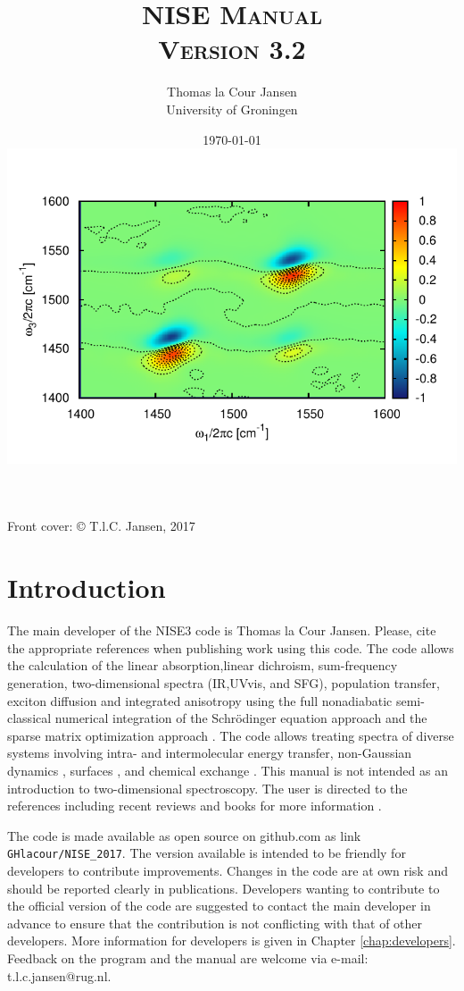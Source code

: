 \documentclass[12pt]{book}
\title{\textsc{NISE Manual\\ Version 3.2}}
\author{Thomas la Cour Jansen\\ University of Groningen}
\date{\today\\ \includegraphics{2ds.pdf}}
\begin{document}
\maketitle

\thispagestyle{empty}
\rule{0mm}{0mm}
\noindent
\thispagestyle{empty}
Front cover: 
\copyright \/ T.l.C. Jansen, 2017
\setcounter{page}{1}
\thispagestyle{empty}
\clearpage

\setcounter{page}{1}


\chapter{Introduction}
The main developer of the NISE3 code is Thomas la Cour Jansen. Please, cite the appropriate
references \cite{Jansen.2006.JPCB.110.22910,Jansen.2009.ACR.42.1405,Jansen.2010.JCP.132.224503,Liang.2012.JCTC.8.1706,Liang.2013.JPCL.4.448}
when publishing work using this code. The code allows the calculation of the linear absorption,linear dichroism, sum-frequency generation, two-dimensional spectra (IR,UVvis, and SFG), population transfer, exciton diffusion and integrated anisotropy using the full nonadiabatic semi-classical numerical integration of the Schr\"{o}dinger equation approach
\cite{Jansen.2009.ACR.42.1405} and the sparse matrix optimization approach \cite{Liang.2012.JCTC.8.1706}. The code allows treating spectra of diverse systems involving
intra- and intermolecular energy transfer\cite{Jansen.2006.JPCB.110.22910,Cringus.2007.JCP.127.084507,Jansen.2008.BJ.94.1818,Dijkstra.2010.JPCA.114.7315,Jansen.2010.JCP.132.224503}, non-Gaussian dynamics \cite{Jansen.2009.JPCA.113.6260,Roy.2011.JPCB.115.5431}, surfaces \cite{Liang.2013.JPCL.4.448}, and chemical exchange \cite{Jansen.2007.JCP.127.234502}. This manual is not intended as an introduction to two-dimensional
spectroscopy. The user is directed to the references including recent reviews \cite{Hamm.1998.JPCB.102.6123,Hochstrasser.2001.CP.266.273,Cho.2008.CR.108.1331,Mukamel.2000.ARPC.51.691,Jansen.2009.ACR.42.1405} and books
for more information \cite{Cho.2009.B01,Mukamel.1995.B01,Hamm.2011.B01}.

The code is made available as open source on github.com as link {\tt GHlacour/NISE\_2017}. The version available is intended to be friendly for developers to contribute improvements. Changes in the code are at own risk and should be reported clearly in publications. Developers wanting to contribute to the official version of the code are suggested to contact the main developer in advance to ensure that the contribution is not conflicting with that of other developers. More information for developers is given in Chapter \ref{chap:developers}. Feedback on the program and the manual are welcome via e-mail: t.l.c.jansen@rug.nl. 
\end{document}
